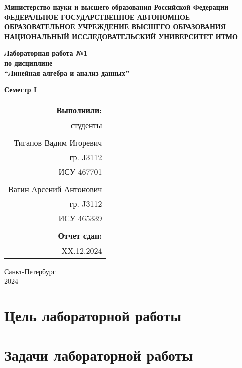 \documentclass[14pt]{extarticle}  %
\begin{document}
\thispagestyle{empty}
\begin{titlepage}
	\begin{center}
		\textbf{Министерство науки и высшего образования Российской Федерации}\\
		\textbf{ФЕДЕРАЛЬНОЕ ГОСУДАРСТВЕННОЕ АВТОНОМНОЕ ОБРАЗОВАТЕЛЬНОЕ УЧРЕЖДЕНИЕ ВЫСШЕГО ОБРАЗОВАНИЯ НАЦИОНАЛЬНЫЙ ИССЛЕДОВАТЕЛЬСКИЙ УНИВЕРСИТЕТ ИТМО}
	\end{center}
	
	\vspace{2cm}
	
	\begin{center}
		\textbf{\Large Лабораторная работа №1}\\
		\textbf{\Large по дисциплине}\\
		\textbf{\Large “Линейная алгебра и анализ данных”}
	\end{center}
	
	\vspace{1cm}
	
	\begin{center}
		\textbf{\Large Семестр I}
	\end{center}
	
	\vspace{3cm}
	
	\begin{flushright}
		\begin{tabular}{r}
			\textbf{Выполнили:} \\
			студенты \\
			\\
			Тиганов Вадим Игоревич \\
			гр. J3112 \\
			ИСУ 467701 \\
			\\
			Вагин Арсений Антонович\\
			гр. J3112 \\
			ИСУ 465339\\
			\\
			\textbf{Отчет сдан:} \\
			XX.12.2024
		\end{tabular}
	\end{flushright}
	
	\vspace{3cm}
	
	\begin{center}
		Санкт-Петербург \\
		2024
	\end{center}
\end{titlepage}

\newpage
{}

\section*{Цель лабораторной работы}


\vspace{0.5cm}

\section*{Задачи лабораторной работы}

	
	
\end{document}
